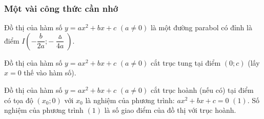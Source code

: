 \subsubsection{Một vài công thức cần nhớ}
\begin{note}
    Đồ thị của hàm số $y=ax^2 + bx + c$ $(a \neq 0)$ là một đường parabol có đỉnh là điểm $I\left(- \dfrac{b}{2a}; - \dfrac{\vartriangle}{4a}\right)$.
\end{note}

\begin{note}
    Đồ thị của hàm số $y=ax^2 + bx + c$ $(a \neq 0)$ cắt trục tung tại điểm $(0;c)$ (lấy $x=0$ thế vào hàm số).
\end{note}

\begin{note}
    Đồ thị của hàm số $y=ax^2 + bx + c$ $(a \neq 0)$ cắt trục hoành (nếu có) tại điểm có tọa độ $(x_0;0)$ với $x_0$ là nghiệm của phương trình: $ax^2+bx+c=0$ $(1)$. Số nghiệm của phương trình $(1)$ là số giao điểm của đồ thị với trục hoành.
\end{note}
